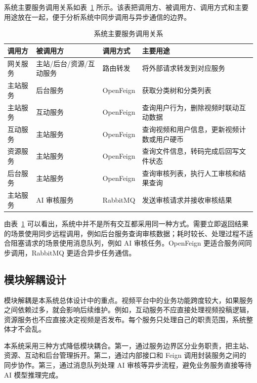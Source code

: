 系统主要服务调用关系如表~\ref{tab:service-call-relations} 所示。该表把调用方、被调用方、调用方式和主要用途放在一起，便于分析系统中同步调用与异步通信的边界。

\begin{table}[htbp]
  \centering
  \caption{系统主要服务调用关系}
  \label{tab:service-call-relations}
  \begin{tabular}{p{}p{}p{}p{}}
    \hline
    \textbf{调用方} & \textbf{被调用方} & \textbf{调用方式} & \textbf{主要用途} \\
    \hline
    网关服务 & 主站/后台/资源/互动服务 & 路由转发 & 将外部请求转发到对应服务 \\
    主站服务 & 后台服务 & OpenFeign & 获取分类树和分类列表 \\
    主站服务 & 互动服务 & OpenFeign & 查询用户行为，删除视频时联动互动数据 \\
    互动服务 & 主站服务 & OpenFeign & 查询视频和用户信息，更新视频计数或用户硬币 \\
    资源服务 & 主站服务 & OpenFeign & 查询文件信息，转码完成后回写文件状态 \\
    后台服务 & 主站服务 & OpenFeign & 查询审核列表，执行人工审核和结果查询 \\
    主站服务 & AI 审核服务 & RabbitMQ & 发送审核请求并接收审核结果 \\
    \hline
  \end{tabular}
\end{table}

由表~\ref{tab:service-call-relations} 可以看出，系统中并不是所有交互都采用同一种方式。需要立即返回结果的场景使用同步远程调用，例如后台服务查询审核数据；耗时较长、处理过程不适合阻塞请求的场景使用消息队列，例如 AI 审核任务。OpenFeign 更适合服务间同步调用，RabbitMQ 更适合异步任务通信\cite{springopenfeign}。

\subsection{模块解耦设计}
\label{subsec:module-decoupling-design}

模块解耦是本系统总体设计中的重点。视频平台中的业务功能跨度较大，如果服务之间依赖过多，就会影响后续维护。例如，互动服务不应直接处理视频投稿逻辑，资源服务也不应直接决定视频是否发布。每个服务只处理自己的职责范围，系统整体才不会乱。

本系统采用三种方式降低模块耦合。第一，通过服务边界区分业务职责，把主站、资源、互动和后台管理拆开。第二，通过内部接口和 Feign 调用封装服务之间的同步协作。第三，通过消息队列处理 AI 审核等异步流程，避免业务服务直接等待 AI 模型推理完成。

